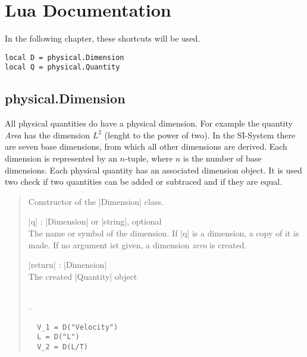 \documentclass{ltxdoc}
\begin{document}
\newpage
\section{Lua Documentation}

In the following chapter, these shortcuts will be used.
\begin{lstlisting}
local D = physical.Dimension
local Q = physical.Quantity
\end{lstlisting}



\subsection{physical.Dimension}

 All physical quantities do have a physical dimension. For example the quantity \emph{Area} has the dimension $L^2$ (lenght to the power of two). In the SI-System there are seven base dimensions, from which all other dimensions are derived. Each dimension is represented by an $n$-tuple, where $n$ is the number of base dimensions. Each physical quantity has an associated dimension object. It is used two check if two quantities can be added or subtraced and if they are equal. 


\begin{quote}
  Constructor of the |Dimension| class.

  \subtitle{Parameters}
  \begin{description}
  \item |q| : |Dimension| or |string|, optional\\
    The name or symbol of the dimension. If |q| is a dimension, a copy of it is made. If no argument ist given, a dimension \emph{zero} is created.

  \item |return| : |Dimension|\\
    The created |Quantity| object
  \end{description}

  \subtitle{Notes}\\
  --

  \subtitle{Examples}
  \begin{lstlisting}
  V_1 = D("Velocity")
  L = D("L")
  V_2 = D(L/T)
  \end{lstlisting}
\end{quote}
\end{document}
